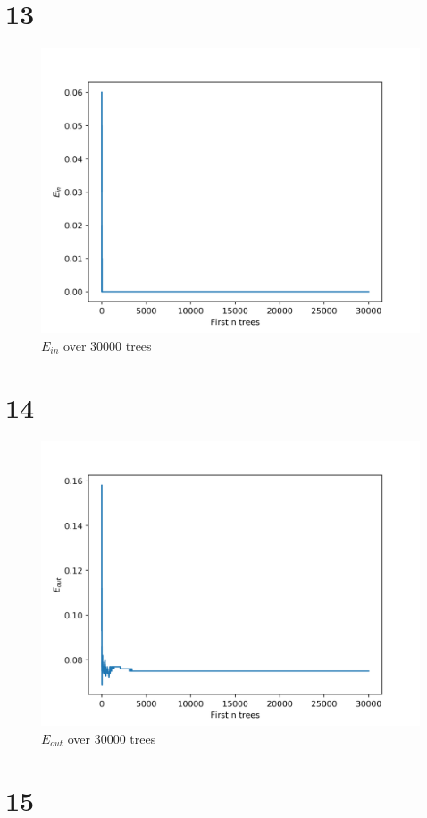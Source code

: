 \documentclass[fleqn,a4paper,12pt]{article}
\begin{document}
\section*{13}

\begin{figure}[H]
\centering
\includegraphics[width=0.75\linewidth]{tree-ein.png}
\caption{$E_{in}$ over 30000 trees}
\label{fig:tree-ein}
\end{figure}

\section*{14}

\begin{figure}[H]
\centering
\includegraphics[width=0.75\linewidth]{tree-eout.png}
\caption{$E_{out}$ over 30000 trees}
\label{fig:tree-eout}
\end{figure}

\section*{15}
\end{document}
